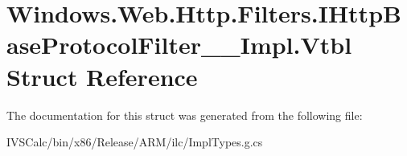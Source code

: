 \hypertarget{struct_windows_1_1_web_1_1_http_1_1_filters_1_1_i_http_base_protocol_filter_____impl_1_1_vtbl}{}\section{Windows.\+Web.\+Http.\+Filters.\+I\+Http\+Base\+Protocol\+Filter\+\_\+\+\_\+\+Impl.\+Vtbl Struct Reference}
\label{struct_windows_1_1_web_1_1_http_1_1_filters_1_1_i_http_base_protocol_filter_____impl_1_1_vtbl}


The documentation for this struct was generated from the following file\+:\begin{DoxyCompactItemize}
\item 
I\+V\+S\+Calc/bin/x86/\+Release/\+A\+R\+M/ilc/Impl\+Types.\+g.\+cs\end{DoxyCompactItemize}
